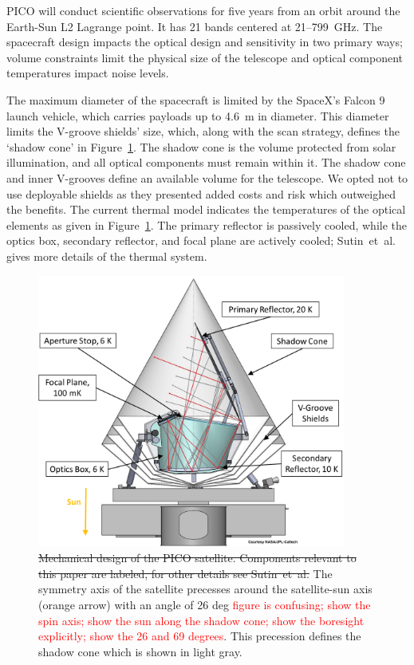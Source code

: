 \documentclass[]{spie}  %
\newcommand{\comr}[1]{\textcolor{red}{#1}}
\begin{document}
PICO will conduct scientific observations for five years from an orbit around the Earth-Sun L2 Lagrange point. It has
21 bands centered at 21--799~GHz.  The spacecraft design impacts 
the optical design and sensitivity in two primary ways; volume constraints limit the physical size of the telescope and optical component 
temperatures impact noise levels.  

The maximum diameter of the spacecraft is limited by the SpaceX's Falcon 9 launch vehicle, which carries payloads up to 4.6~m in diameter. 
This diameter limits the V-groove shields' size, which, along with the scan strategy, defines the `shadow cone' in Figure~\ref{fig:cad}.  
The shadow cone is the volume protected from solar illumination, and all optical components must remain within it. The shadow cone and 
inner V-grooves define an available volume for the telescope.  We opted not to use deployable shields as they presented added costs 
and risk which outweighed the benefits. The current thermal model indicates the temperatures of the optical elements as given in Figure~\ref{fig:cad}. 
The primary reflector is passively cooled, while the optics box, secondary reflector, and focal plane are actively cooled; Sutin~et~al.\cite{brian_spie}
gives more details of the thermal system. 

\begin{figure} [ht]
\begin{center}
\includegraphics[height=9cm]{PICO_CAD_annotated.png}
\end{center}
\caption { \label{fig:cad} 
\sout{Mechanical design of the PICO satellite. Components relevant to this paper are labeled, for other details see Sutin~et~al.\cite{brian_spie}}
The symmetry axis of the satellite precesses around the satellite-sun axis (orange arrow) with an angle of 26 deg \comr{figure is confusing; show the spin 
axis; show the sun along the shadow cone; show the boresight explicitly; show the 26 and 69 degrees}. This precession defines the 
shadow cone which is shown in light gray.
}
\end{figure} 
\end{document}
